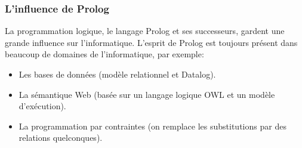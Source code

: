 \subsubsection{L'influence de Prolog}

La programmation logique, le langage Prolog et ses successeurs,
gardent une grande influence sur l'informatique.
L'esprit de Prolog est toujours présent
dans beaucoup de domaines de l'informatique, par exemple:
\begin{itemize}
\item Les bases de données (modèle relationnel et Datalog).
\item La sémantique Web (basée sur un langage logique OWL et un modèle d'exécution).
\item La programmation par contraintes (on remplace les substitutions par des relations quelconques).
\end{itemize}

